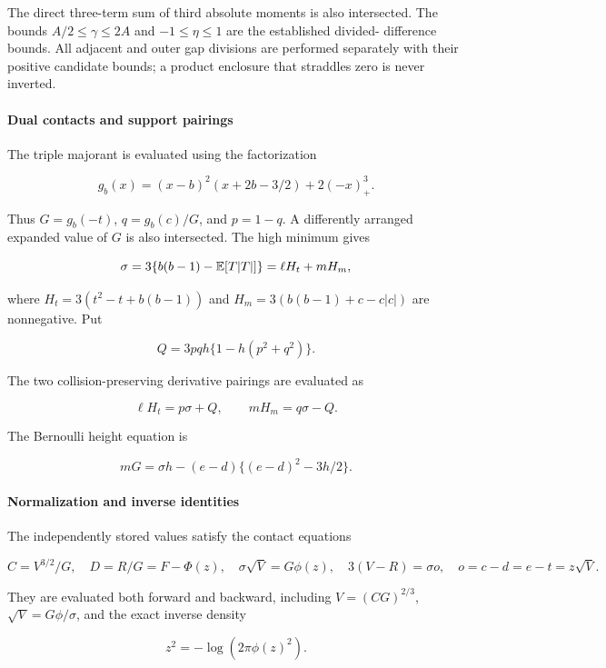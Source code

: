 The direct three-term sum of third absolute moments is also intersected. The bounds
$A/2\le \gamma\le 2A$ and $-1\le \eta\le 1$ are the established divided-
difference bounds. All adjacent and outer gap divisions are performed
separately with their positive candidate bounds; a product enclosure that
straddles zero is never inverted.

\paragraph{Dual contacts and support pairings}

The triple majorant is evaluated using the factorization

\[
 g_b(x)=(x-b)^2(x+2b-3/2)+2(-x)_+^3. \tag{B.18.4}\label{contact:collision-210-raw-law-replay-4}
\]

Thus $G=g_b(-t)$, $q=g_b(c)/G$, and $p=1-q$. A differently arranged
expanded value of $G$ is also intersected. The high minimum gives

\[
 \sigma=3\{b(b-1)-\mathbb E[T|T|]\}=\ell H_t+mH_m,
\]

where $H_t=3(t^2-t+b(b-1))$ and
$H_m=3(b(b-1)+c-c|c|)$ are nonnegative. Put

\[
 Q=3pq h\{1-h(p^2+q^2)\}.
\]

The two collision-preserving derivative pairings are evaluated as

\[
 \ell H_t=p\sigma+Q,\qquad mH_m=q\sigma-Q. \tag{B.18.5}\label{contact:collision-210-raw-law-replay-5}
\]

The Bernoulli height equation is

\[
 mG=\sigma h-(e-d)\{(e-d)^2-3h/2\}. \tag{B.18.6}\label{contact:collision-210-raw-law-replay-6}
\]

\paragraph{Normalization and inverse identities}

The independently stored values satisfy the contact equations

\[
 C=V^{3/2}/G,\quad D=R/G=F-\Phi(z),\quad
 \sigma\sqrt V=G\phi(z),\quad 3(V-R)=\sigma o,
 \quad o=c-d=e-t=z\sqrt V. \tag{B.18.7}\label{contact:collision-210-raw-law-replay-7}
\]

They are evaluated both forward and backward, including
$V=(CG)^{2/3}$, $\sqrt{V}=G \phi/\sigma$, and the exact inverse density

\[
 z^2=-\log(2\pi\phi(z)^2). \tag{B.18.8}\label{contact:collision-210-raw-law-replay-8}
\]


